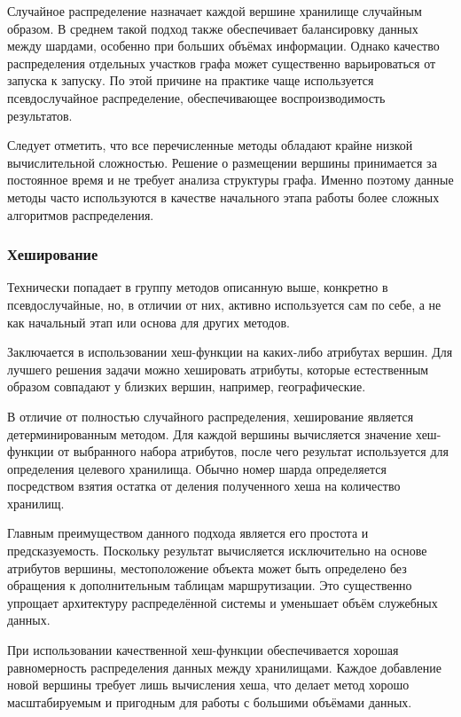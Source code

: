 Случайное распределение назначает каждой вершине хранилище случайным образом. В среднем такой подход также обеспечивает балансировку данных между шардами, особенно при больших объёмах информации. Однако качество распределения отдельных участков графа может существенно варьироваться от запуска к запуску. По этой причине на практике чаще используется псевдослучайное распределение, обеспечивающее воспроизводимость результатов.

Следует отметить, что все перечисленные методы обладают крайне низкой вычислительной сложностью. Решение о размещении вершины принимается за постоянное время и не требует анализа структуры графа. Именно поэтому данные методы часто используются в качестве начального этапа работы более сложных алгоритмов распределения.

\subsubsection{Хеширование}

Технически попадает в группу методов описанную выше, конкретно в псевдослучайные, но, в отличии от них, активно используется сам по себе, а не как начальный этап или основа для других методов.

Заключается в использовании хеш-функции на каких-либо атрибутах вершин. Для лучшего решения задачи можно хешировать атрибуты, которые естественным образом совпадают у близких вершин, например, географические.

В отличие от полностью случайного распределения, хеширование является детерминированным методом. Для каждой вершины вычисляется значение хеш-функции от выбранного набора атрибутов, после чего результат используется для определения целевого хранилища. Обычно номер шарда определяется посредством взятия остатка от деления полученного хеша на количество хранилищ.

Главным преимуществом данного подхода является его простота и предсказуемость. Поскольку результат вычисляется исключительно на основе атрибутов вершины, местоположение объекта может быть определено без обращения к дополнительным таблицам маршрутизации. Это существенно упрощает архитектуру распределённой системы и уменьшает объём служебных данных.

При использовании качественной хеш-функции обеспечивается хорошая равномерность распределения данных между хранилищами. Каждое добавление новой вершины требует лишь вычисления хеша, что делает метод хорошо масштабируемым и пригодным для работы с большими объёмами данных.

